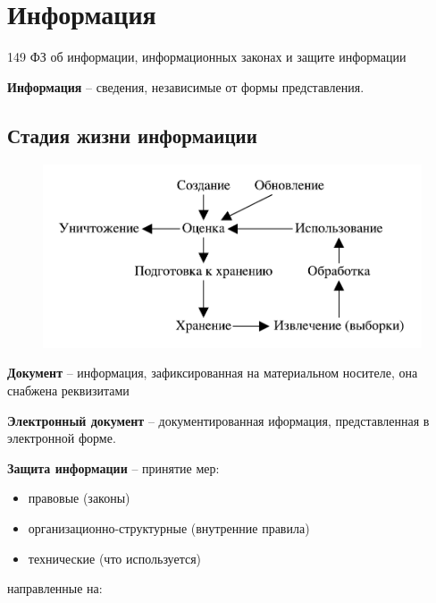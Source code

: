 \section{Информация}

149 ФЗ об информации, информационных законах и защите информации

\textbf{Информация} -- сведения, независимые от формы представления.

\subsection{Стадия жизни информаиции}

\begin{figure}[H]
    \centering
    \includegraphics[scale=1]{img/information.pdf}
\end{figure}

\textbf{Документ} -- информация, зафиксированная на материальном носителе, она снабжена реквизитами

\textbf{Электронный документ} -- документированная иформация, представленная в электронной форме.

\textbf{Защита информации} -- принятие мер:

\begin{itemize}
    \item правовые (законы)
    \item организационно-структурные (внутренние правила)
    \item технические (что используется)
\end{itemize}

направленные на:

